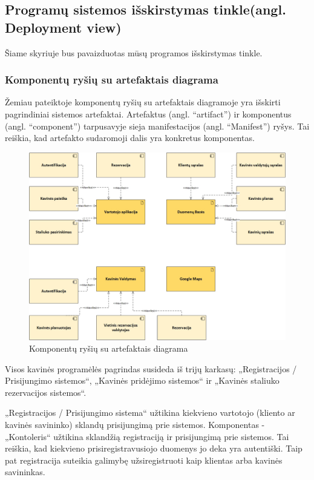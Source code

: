 \documentclass{VUMIFPSkursinis}
\begin{document}
{{{{{\subsection{Programų sistemos išskirstymas tinkle(angl. Deployment view)}
Šiame skyriuje bus pavaizduotas mūsų programos išskirstymas tinkle.
\subsubsection{Komponentų ryšių su artefaktais diagrama}

Žemiau pateiktoje komponentų ryšių su artefaktais diagramoje yra išskirti pagrindiniai sistemos artefaktai. Artefaktus (angl. “artifact”) ir komponentus (angl. “component”) tarpusavyje sieja manifestacijos (angl. “Manifest”) ryšys. Tai reiškia, kad artefakto sudaromoji dalis yra konkretus komponentas.


\begin{figure}[H]
    \centering
    \includegraphics[width=\textwidth,height=\textheight,keepaspectratio]{img/Deployment_diagram1} 
    \caption{Komponentų ryšių su artefaktais diagrama}
    \label{img:Model}
\end{figure}




Visos kavinės programėlės pagrindas susideda iš trijų karkasų: „Registracijos / Prisijungimo sistemos“, „Kavinės pridėjimo sistemos“ ir „Kavinės staliuko rezervacijos sistemos“.

„Registracijos / Prisijungimo sistema“ užtikina kiekvieno vartotojo (kliento ar kavinės savininko) sklandų prisijungimą prie sistemos. Komponentas - „Kontoleris“ užtikina sklandžią registraciją ir prisijungimą prie sistemos. Tai reiškia, kad kiekvieno prisiregistravusiojo duomenys jo deka yra autentiški. Taip pat registracija suteikia galimybę užsiregistruoti kaip klientas arba kavinės savininkas.

}}}}}
\end{document}
